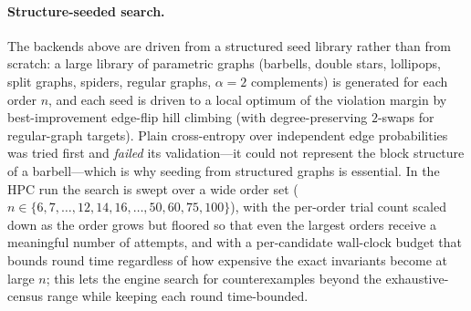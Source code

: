 \documentclass[]{ceurart}
\begin{document}
\paragraph{Structure-seeded search.} The backends above are driven from a
structured seed library rather than from scratch: a large library of parametric
graphs (barbells, double stars, lollipops, split graphs, spiders, regular graphs,
$\alpha=2$ complements) is generated for each order $n$, and each seed is driven
to a local optimum of the violation margin by best-improvement edge-flip hill
climbing (with degree-preserving $2$-swaps for regular-graph targets). Plain
cross-entropy over independent edge probabilities was tried first and
\emph{failed} its validation---it could not represent the block structure of a
barbell---which is why seeding from structured graphs is essential. In the HPC run the search is
swept over a wide order set ($n\in\{6,7,\dots,12,14,16,\dots,50,60,75,100\}$), with the per-order trial count scaled down as the order grows but floored
so that even the largest orders receive a meaningful number of attempts, and with a per-candidate
wall-clock budget that bounds round time regardless of how expensive the exact invariants become at
large $n$; this lets the engine search for counterexamples beyond the exhaustive-census range while
keeping each round time-bounded.
\end{document}
